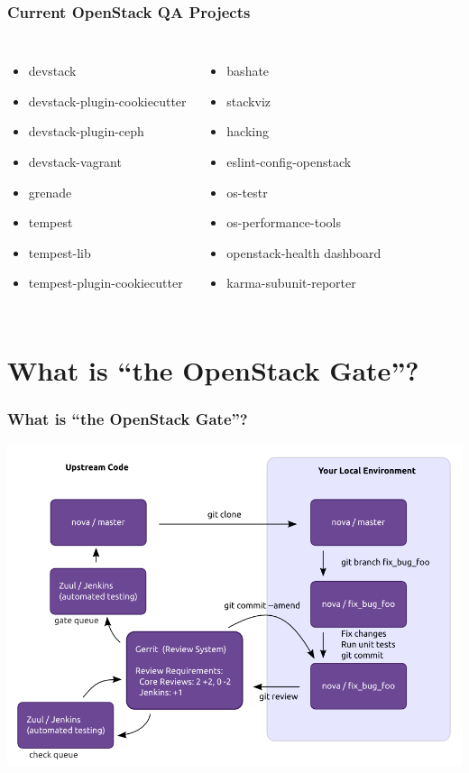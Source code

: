 \documentclass[aspectratio=43,11pt,hyperref={colorlinks=true}]{beamer}
\begin{document}
\begin{frame}
    \frametitle{Current OpenStack QA Projects}
    \begin{columns}
            \begin{itemize}
                \item{devstack}
                \item{devstack-plugin-cookiecutter}
                \item{devstack-plugin-ceph}
                \item{devstack-vagrant}
                \item{grenade}
                \item{tempest}
                \item{tempest-lib}
                \item{tempest-plugin-cookiecutter}
            \end{itemize}
            \begin{itemize}
                \item{bashate}
                \item{stackviz}
                \item{hacking}
                \item{eslint-config-openstack}
                \item{os-testr}
                \item{os-performance-tools}
                \item{openstack-health dashboard}
                \item{karma-subunit-reporter}
            \end{itemize}
    \end{columns}
\end{frame}

\section{What is ``the OpenStack Gate''?}
\begin{frame}
    \frametitle{What is ``the OpenStack Gate''?}
    \begin{center}
        \includegraphics[width=.85\textwidth]{code_review.png}
    \end{center}
\end{frame}
\end{document}
